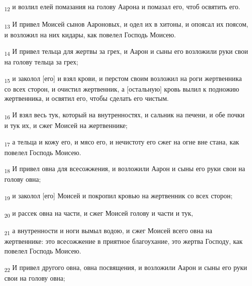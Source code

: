 \begin{tcolorbox}
\textsubscript{12} и возлил елей помазания на голову Аарона и помазал его, чтоб освятить его.
\end{tcolorbox}
\begin{tcolorbox}
\textsubscript{13} И привел Моисей сынов Аароновых, и одел их в хитоны, и опоясал их поясом, и возложил на них кидары, как повелел Господь Моисею.
\end{tcolorbox}
\begin{tcolorbox}
\textsubscript{14} И привел тельца для жертвы за грех, и Аарон и сыны его возложили руки свои на голову тельца за грех;
\end{tcolorbox}
\begin{tcolorbox}
\textsubscript{15} и заколол [его] и взял крови, и перстом своим возложил на роги жертвенника со всех сторон, и очистил жертвенник, а [остальную] кровь вылил к подножию жертвенника, и освятил его, чтобы сделать его чистым.
\end{tcolorbox}
\begin{tcolorbox}
\textsubscript{16} И взял весь тук, который на внутренностях, и сальник на печени, и обе почки и тук их, и сжег Моисей на жертвеннике;
\end{tcolorbox}
\begin{tcolorbox}
\textsubscript{17} а тельца и кожу его, и мясо его, и нечистоту его сжег на огне вне стана, как повелел Господь Моисею.
\end{tcolorbox}
\begin{tcolorbox}
\textsubscript{18} И привел овна для всесожжения, и возложили Аарон и сыны его руки свои на голову овна;
\end{tcolorbox}
\begin{tcolorbox}
\textsubscript{19} и заколол [его] Моисей и покропил кровью на жертвенник со всех сторон;
\end{tcolorbox}
\begin{tcolorbox}
\textsubscript{20} и рассек овна на части, и сжег Моисей голову и части и тук,
\end{tcolorbox}
\begin{tcolorbox}
\textsubscript{21} а внутренности и ноги вымыл водою, и сжег Моисей всего овна на жертвеннике: это всесожжение в приятное благоухание, это жертва Господу, как повелел Господь Моисею.
\end{tcolorbox}
\begin{tcolorbox}
\textsubscript{22} И привел другого овна, овна посвящения, и возложили Аарон и сыны его руки свои на голову овна;
\end{tcolorbox}

